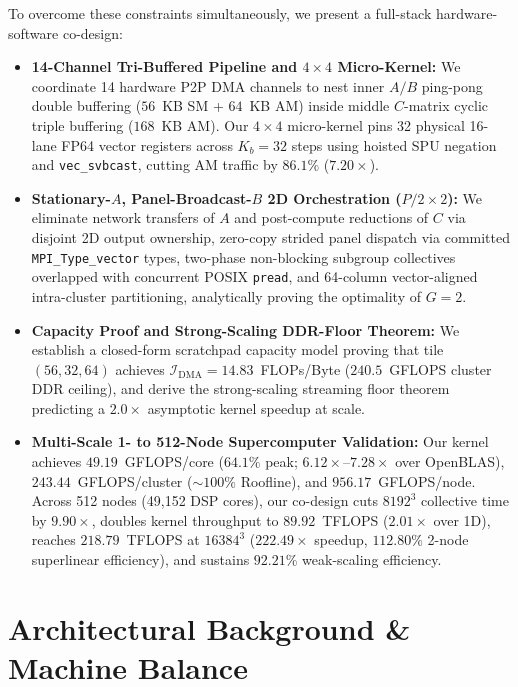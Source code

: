 \documentclass[conference]{IEEEtran}
\begin{document}
To overcome these constraints simultaneously, we present a full-stack hardware-software co-design:
\begin{itemize}\setlength{\itemsep}{0.5pt}\setlength{\parskip}{0pt}
    \item \textbf{14-Channel Tri-Buffered Pipeline and $4 \times 4$ Micro-Kernel:} We coordinate 14 hardware P2P DMA channels to nest inner $A/B$ ping-pong double buffering ($56$~KB SM + $64$~KB AM) inside middle $C$-matrix cyclic triple buffering ($168$~KB AM). Our $4 \times 4$ micro-kernel pins 32 physical 16-lane FP64 vector registers across $K_b=32$ steps using hoisted SPU negation and \texttt{vec\_svbcast}, cutting AM traffic by $86.1\%$ ($7.20\times$).
    \item \textbf{Stationary-$A$, Panel-Broadcast-$B$ 2D Orchestration ($P/2 \times 2$):} We eliminate network transfers of $A$ and post-compute reductions of $C$ via disjoint 2D output ownership, zero-copy strided panel dispatch via committed \texttt{MPI\_Type\_vector} types, two-phase non-blocking subgroup collectives overlapped with concurrent POSIX \texttt{pread}, and 64-column vector-aligned intra-cluster partitioning, analytically proving the optimality of $G=2$.
    \item \textbf{Capacity Proof and Strong-Scaling DDR-Floor Theorem:} We establish a closed-form scratchpad capacity model proving that tile $(56, 32, 64)$ achieves $\mathcal{I}_{\mathrm{DMA}} = 14.83$~FLOPs/Byte ($240.5$~GFLOPS cluster DDR ceiling), and derive the strong-scaling streaming floor theorem predicting a $2.0\times$ asymptotic kernel speedup at scale.
    \item \textbf{Multi-Scale 1- to 512-Node Supercomputer Validation:} Our kernel achieves $49.19$~GFLOPS/core ($64.1\%$ peak; $6.12\times$--$7.28\times$ over OpenBLAS), $243.44$~GFLOPS/cluster ($\sim\!100\%$ Roofline), and $956.17$~GFLOPS/node. Across 512 nodes (49,152 DSP cores), our co-design cuts $8192^3$ collective time by $9.90\times$, doubles kernel throughput to $89.92$~TFLOPS ($2.01\times$ over 1D), reaches $218.79$~TFLOPS at $16384^3$ ($222.49\times$ speedup, $112.80\%$ 2-node superlinear efficiency), and sustains $92.21\%$ weak-scaling efficiency.
\end{itemize}

\section{Architectural Background \& Machine Balance}
\label{sec:background}
\end{document}
